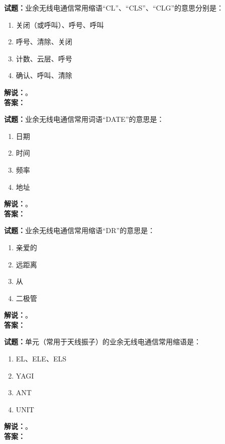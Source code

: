 \documentclass{ctexbook}
\begin{document}
\vspace{\baselineskip}

\noindent\textbf{试题：}业余无线电通信常用缩语“CL”、“CLS”、“CLG”的意思分别是：
\begin{enumerate}[leftmargin=3em]
  \item 关闭（或呼叫）、呼号、呼叫
  \item 呼号、清除、关闭
  \item 计数、云层、呼号
  \item 确认、呼叫、清除
\end{enumerate}
\noindent\textbf{解说：}\textbf{}。\\\noindent\textbf{答案：}

\vspace{\baselineskip}

\noindent\textbf{试题：}业余无线电通信常用词语“DATE”的意思是：
\begin{enumerate}[leftmargin=3em]
  \item 日期
  \item 时间
  \item 频率
  \item 地址
\end{enumerate}
\noindent\textbf{解说：}\textbf{}。\\\noindent\textbf{答案：}

\vspace{\baselineskip}

\noindent\textbf{试题：}业余无线电通信常用缩语“DR”的意思是：
\begin{enumerate}[leftmargin=3em]
  \item 亲爱的
  \item 远距离
  \item 从
  \item 二极管
\end{enumerate}
\noindent\textbf{解说：}\textbf{}。\\\noindent\textbf{答案：}

\vspace{\baselineskip}

\noindent\textbf{试题：}单元（常用于天线振子）的业余无线电通信常用缩语是：
\begin{enumerate}[leftmargin=3em]
  \item EL、ELE、ELS
  \item YAGI
  \item ANT
  \item UNIT
\end{enumerate}
\noindent\textbf{解说：}\textbf{}。\\\noindent\textbf{答案：}
\end{document}
